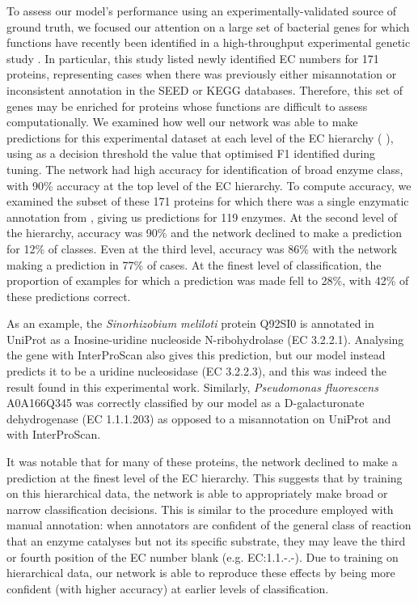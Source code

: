 \DIFaddbegin {}\DIFaddend To assess our model's performance using an \DIFdelbegin {}\DIFdelend experimentally-validated source of ground truth, we focused our attention on a large set of bacterial genes for which functions have recently been identified in a high-throughput experimental genetic study \citep{phenotypes}. In particular, this study listed newly identified EC numbers for 171 proteins, representing cases when there was previously either misannotation or inconsistent annotation in the SEED or KEGG databases. Therefore, this set of genes may be enriched for proteins whose functions are difficult to assess computationally.
We examined how well our network was able to make predictions for this experimental dataset at each level of the EC hierarchy (%
), using as a decision threshold the value that optimised F1 identified during tuning. The network had high accuracy for identification of broad enzyme class, with 90\% accuracy at the top level of the EC hierarchy. To compute accuracy, we examined the subset of these 171 proteins for which there was a single enzymatic annotation from \cite{phenotypes}, giving us predictions for 119 enzymes. At the second level of the hierarchy, accuracy was 90\% and the network declined to make a prediction for 12\% of classes. Even at the third level, accuracy was 86\% with the network making a prediction in 77\% of cases. At the finest level of classification, the proportion of examples for which a prediction was made fell to 28\%, with 42\% of these predictions correct.

As an  example, the \textit{Sinorhizobium meliloti} protein Q92SI0 is annotated in UniProt as a Inosine-uridine nucleoside N-ribohydrolase (EC 3.2.2.1).  Analysing the gene with InterProScan \citep{interproscan} also gives this prediction, but our model instead predicts it to be a uridine nucleosidase (EC 3.2.2.3), and this was indeed the result found in this experimental work. Similarly, \textit{Pseudomonas fluorescens} A0A166Q345 was correctly classified by our model as a D-galacturonate dehydrogenase (EC 1.1.1.203) as opposed to a misannotation on UniProt and with InterProScan.


It was notable that for many of these proteins, the network declined to make a prediction at the finest level of the EC hierarchy. This suggests that by training on this hierarchical data, the network is able to appropriately make broad or narrow classification decisions. This is similar to the procedure employed with manual annotation: when annotators are confident of the general class of reaction that an enzyme catalyses but not its specific substrate, they may leave the third or fourth position of the EC number blank (e.g. EC:1.1.-.-). Due to training on hierarchical data, our network is able to reproduce these effects by being more confident (with higher accuracy) at earlier levels of classification.

